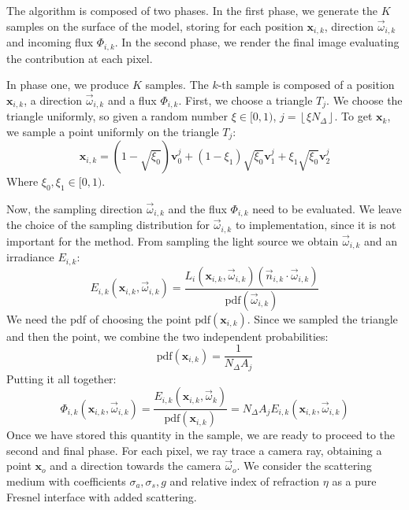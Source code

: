 \documentclass[10pt,a4paper]{article}
\begin{document}
The algorithm is composed of two phases. In the first phase, we generate the $K$ samples on the surface of the model, storing for each position $\mathbf{x}_{i,k}$, direction $\vec{\omega}_{i,k}$ and incoming flux $\Phi_{i,k}$. In the second phase, we render the final image evaluating the contribution at each pixel.

In phase one, we produce $K$ samples. The $k$-th  sample is composed of a position $\mathbf{x}_{i,k}$, a direction $\vec{\omega}_{i,k}$ and a flux $\Phi_{i,k}$. First, we choose a triangle $T_j$. We choose the triangle uniformly, so given a random number $\xi \in [0,1)$, $j = \left \lfloor{\xi N_\Delta}\right \rfloor$. To get $\mathbf{x}_k$, we sample a point uniformly on the triangle $T_j$:
\begin{equation*}
\mathbf{x}_{i,k} = (1 - \sqrt{\xi_0})\mathbf{v}^j_0 + (1 - {\xi_1})  \sqrt{\xi_0} \mathbf{v}^j_1 +  \xi_1\sqrt{\xi_0} \mathbf{v}^j_2
\end{equation*}
Where $\xi_0, \xi_1 \in [0,1)$. 

Now, the sampling direction $\vec{\omega}_{i,k}$ and the flux $\Phi_{i,k}$ need to be evaluated. We leave the choice of the sampling distribution for $\vec{\omega}_{i,k}$ to implementation, since it is not important for the method. From sampling the light source we obtain $\vec{\omega}_{i,k}$ and an irradiance $E_{i,k}$:
\begin{equation*}
E_{i,k}(\mathbf{x}_{i,k}, \vec{\omega}_{i,k}) = \frac{L_i(\mathbf{x}_{i,k}, \vec{\omega}_{i,k}) (\vec{n}_{i,k} \cdot \vec{\omega}_{i,k})}{\text{pdf}(\vec{\omega}_{i,k})}
\end{equation*}
We need the pdf of choosing the point $\text{pdf}(\mathbf{x}_{i,k})$. Since we sampled the triangle and then the point, we combine the two independent probabilities:
\begin{equation*}
\text{pdf}(\mathbf{x}_{i,k}) = \frac{1}{N_\Delta A_j} 
\end{equation*}
Putting it all together:
\begin{equation*}
\Phi_{i,k}(\mathbf{x}_{i,k}, \vec{\omega}_{i,k})  = \frac{E_{i,k}(\mathbf{x}_{i,k}, \vec{\omega}_k) }{\text{pdf}(\mathbf{x}_{i,k})} = N_\Delta A_j E_{i,k}(\mathbf{x}_{i,k}, \vec{\omega}_{i,k})
\end{equation*}
Once we have stored this quantity in the sample, we are ready to proceed to the second and final phase. For each pixel, we ray trace a camera ray, obtaining a point $\mathbf{x}_o$ and a direction towards the camera $\vec{\omega}_o$. We consider the scattering medium with coefficients $\sigma_a, \sigma_s, g$ and relative index of refraction $\eta$ as a pure Fresnel interface with added scattering. 
\end{document}

